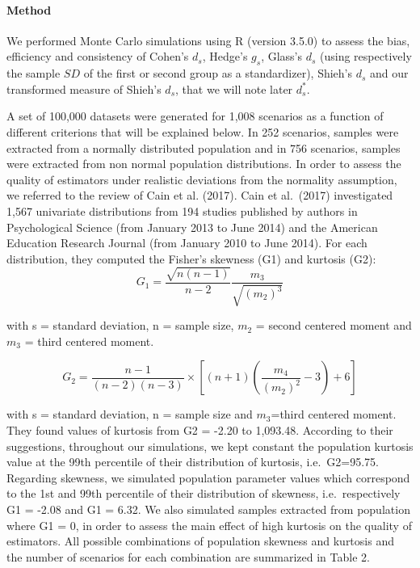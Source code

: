 \documentclass[
  man,floatsintext]{apa6}
\begin{document}
\hypertarget{method}{%
\paragraph{Method}\label{method}}

We performed Monte Carlo simulations using R (version 3.5.0) to assess the bias, efficiency and consistency of Cohen's \(d_s\), Hedge's \(g_s\), Glass's \(d_s\) (using respectively the sample \(SD\) of the first or second group as a standardizer), Shieh's \(d_s\) and our transformed measure of Shieh's \(d_s\), that we will note later \(d_s^*\).

A set of 100,000 datasets were generated for 1,008 scenarios as a function of different criterions that will be explained below. In 252 scenarios, samples were extracted from a normally distributed population and in 756 scenarios, samples were extracted from non normal population distributions. In order to assess the quality of estimators under realistic deviations from the normality assumption, we referred to the review of Cain et al. (2017). Cain et al.~(2017) investigated 1,567 univariate distributions from 194 studies published by authors in Psychological Science (from January 2013 to June 2014) and the American Education Research Journal (from January 2010 to June 2014). For each distribution, they computed the Fisher's skewness (G1) and kurtosis (G2):
\begin{equation} 
G_{1}=\frac{\sqrt{n(n-1)}}{n-2} \frac{m_{3}}{\sqrt{(m_{2})^3}}
\label{eq:skew}
\end{equation}

with s = standard deviation, n = sample size, \(m_{2}\) = second centered moment and \(m_{3}\) = third centered moment.

\begin{equation} 
G_{2}=\frac{n-1}{(n-2)(n-3)}\times [(n+1)(\frac{m_{4}}{(m_{2})^2}-3)+6]
\label{eq:kurt}
\end{equation}

with s = standard deviation, n = sample size and \(m_{3}\)=third centered moment. They found values of kurtosis from G2 = -2.20 to 1,093.48. According to their suggestions, throughout our simulations, we kept constant the population kurtosis value at the 99th percentile of their distribution of kurtosis, i.e.~G2=95.75. Regarding skewness, we simulated population parameter values which correspond to the 1st and 99th percentile of their distribution of skewness, i.e.~respectively G1 = -2.08 and G1 = 6.32. We also simulated samples extracted from population where G1 = 0, in order to assess the main effect of high kurtosis on the quality of estimators. All possible combinations of population skewness and kurtosis and the number of scenarios for each combination are summarized in Table 2.
\end{document}

